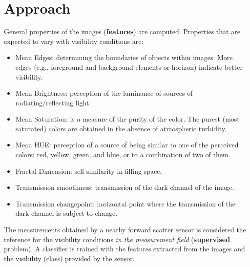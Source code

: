 \documentclass{article}
\begin{document}
\section*{Approach}
General properties of the images (\textbf{features}) are computed. 
Properties that are expected to vary with visibility conditions are:

\begin{tcolorbox}[colback=red!5!white,colframe=red!75!black,title=Image Features]
\begin{itemize}
\item{Mean Edges: determining the boundaries of objects within images. 
More edges (e.g., foreground and background elements or horizon) indicate better
visibility.
}
\item{Mean Brightness: perception of the luminance of sources of radiating/reflecting light.}
\item{Mean Saturation: is a measure of the purity of the color. 
The purest (most saturated) colors are obtained in the absence of atmospheric turbidity.
}
\item{Mean HUE: perception of a source of being similar to one of the perceived colors: red, yellow, green, and blue, or to a combination of two of them.}
\item{Fractal Dimension: self similarity in filling space.}
\item{Transmission smoothness: transmission of the dark channel of the image.}
\item{Transmission changepoint: horizontal point where the transmission of the dark channel is subject to change.}
\end{itemize}
\end{tcolorbox}


The measurements obtained by a nearby forward scatter sensor is considered the
reference for the visibility conditions \emph{in the measurement field}
(\textbf{supervised} problem).\newline
A classifier is trained with the features extracted from the images and the 
visibility (class) provided by the sensor.
\vspace*{0.8cm}
\end{document}
